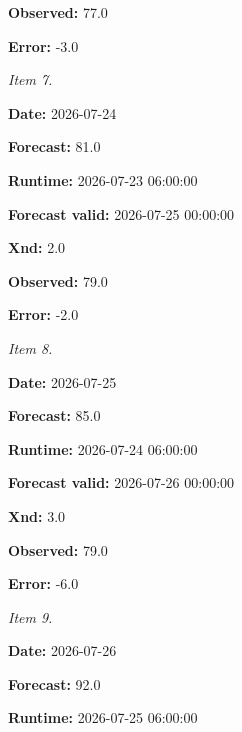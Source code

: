 \documentclass[11pt]{article}
\begin{document}
\par\noindent\textbf{Observed:} 77.0

\par\noindent\textbf{Error:} -3.0

\par\noindent\textit{Item 7.}\par \par\noindent\textbf{Date:} 2026-07-24

\par\noindent\textbf{Forecast:} 81.0

\par\noindent\textbf{Runtime:} 2026-07-23 06:00:00

\par\noindent\textbf{Forecast valid:} 2026-07-25 00:00:00

\par\noindent\textbf{Xnd:} 2.0

\par\noindent\textbf{Observed:} 79.0

\par\noindent\textbf{Error:} -2.0

\par\noindent\textit{Item 8.}\par \par\noindent\textbf{Date:} 2026-07-25

\par\noindent\textbf{Forecast:} 85.0

\par\noindent\textbf{Runtime:} 2026-07-24 06:00:00

\par\noindent\textbf{Forecast valid:} 2026-07-26 00:00:00

\par\noindent\textbf{Xnd:} 3.0

\par\noindent\textbf{Observed:} 79.0

\par\noindent\textbf{Error:} -6.0

\par\noindent\textit{Item 9.}\par \par\noindent\textbf{Date:} 2026-07-26

\par\noindent\textbf{Forecast:} 92.0

\par\noindent\textbf{Runtime:} 2026-07-25 06:00:00
\end{document}
